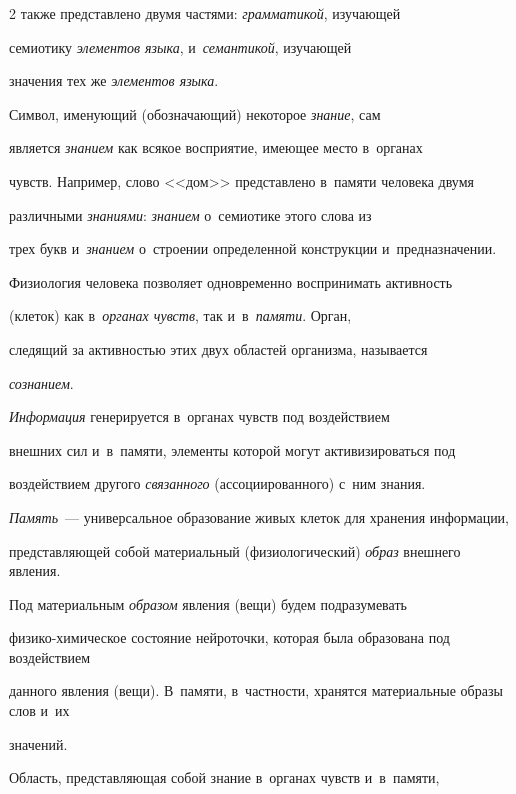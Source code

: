 \begin{multicols}{2}
также представлено двумя час\-тя\-ми: \textit{грамматикой}, изучающей 

семиотику \textit{элементов языка}, и~\textit{семантикой}, изучающей 

значения тех же \textit{элементов языка}. 

  

  Символ, именующий (обозначающий) некоторое \textit{знание}, сам 

является \textit{знанием} как всякое восприятие, име\-ющее место в~органах 

чувств. Например, слово <<дом>> представлено в~памяти человека двумя 

различными \textit{знаниями}: \textit{знанием} о~семиотике этого слова из 

трех букв и~\textit{знанием} о~стро\-ении определенной конструкции и~предназначении. 

  

  Физиология человека позволяет одновременно воспринимать активность 

(клеток) как в~\textit{органах чувств}, так и~в~\textit{памяти}. Орган, 

следящий за активностью этих двух областей организма, называется 

\textit{со\-зна\-нием}. 

  

  \textit{Информация} генерируется в~органах чувств под воздействием 

внешних сил и~в~памяти, элементы которой могут активизироваться под 

воздействием другого \textit{связанного} (ассоциированного) с~ним знания.

   

  \textit{Память}~--- универсальное образование живых клеток для хранения информации, 

пред\-став\-ля\-ющей собой материальный (физиологический) \textit{образ} внеш\-не\-го явления. 

Под материальным \textit{образом} явления (вещи) будем подразумевать  

фи\-зи\-ко-хи\-ми\-че\-ское со\-сто\-яние ней\-ро\-точ\-ки, которая была образована под воздействием 

данного явления (вещи). В~памяти, в~част\-ности, хранятся материальные образы слов и~их 

значений. 

   

  Область, представляющая собой знание в~органах чувств и~в~памяти, 


\end{multicols}
